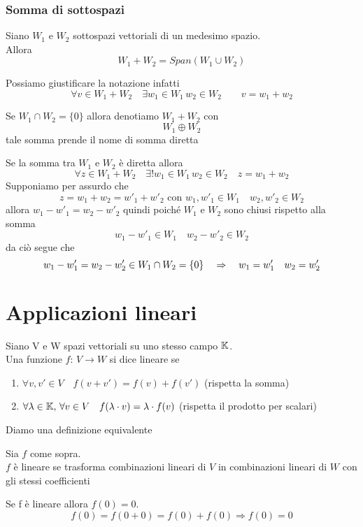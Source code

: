 \subsubsection{Somma di sottospazi}
\begin{defn}\bianco
Siano $W_1 \text{ e } W_2 $ sottospazi vettoriali di un medesimo spazio.\\
Allora 
$$ W_1+W_2 = Span (W_1 \cup W_2)$$ 
\begin{oss}
Possiamo giustificare la notazione infatti 
$$ \forall v \in W_1 + W_2 \quad \exists w_1 \in W_1 \, w_2 \in W_2 \qquad v=w_1+w_2 $$
\end{oss}
\end{defn}
\spazio 
\begin{defn}  \bianco
 Se $W_1 \cap W_2=\{0\}$ allora denotiamo 
 $ W_1+W_2$ con 
$$W_1  \oplus W_2 $$ 
tale somma prende il nome di somma diretta
\end{defn}


\begin{thm} Se la somma tra $W_1$ e $W_2$ è diretta allora $$\forall z \in W_1 +  W_2 \quad  \exists ! w_1 \in W_1 \, w_2 \in W_2 \quad z=w_1+w_2$$
\proof Supponiamo per assurdo che 
$$z=w_1+w_2=w'_1+w'_2 \text {  con }w_1, w'_1 \in W_1 \quad w_2,w'_2 \in W_2$$ allora 
$w_1-w'_1=w_2-w'_2$ quindi poiché $W_1$ e $W_2$ sono chiusi rispetto alla somma $$w_1-w'_1 \in W_1 \quad w_2-w'_2 \in W_2$$ da ciò segue che $$ w_1-w'_1=w_2-w'_2 \in W_1 \cap W_2=\{ 0 \} \quad \Rightarrow \quad w_1= w'_1\quad w_2=w'_2$$ \endproof
\end{thm}

\newpage

\section{Applicazioni lineari}
\begin{defn}\bianco
Siano V e W spazi vettoriali su uno stesso campo $\mathbb{K}$.\\
Una funzione $f:\, V \to W $ si dice lineare se 
\begin{enumerate}
\item $ \forall v,v' \in V \quad f(v+v')=f(v)+f(v')$ (rispetta la somma)
\item $\forall \lambda \in \mathbb{K} , \, \forall v \in V \quad f(\lambda \cdot v )= \lambda \cdot f(v)$ (rispetta il prodotto per scalari)
\end{enumerate}
\end{defn}
Diamo una definizione equivalente
\begin{defn}
Sia $f$ come sopra.\\
$f$  \`e lineare se trasforma combinazioni lineari di $V$ in combinazioni lineari di $W$ con gli stessi coefficienti

\end{defn}
\begin{oss} Se f è lineare allora $f(0)=0$.\\
$$f(0)=f(0+0)=f(0)+f(0) \Rightarrow f(0)=0$$
\end{oss}
\vspace{0.5 cm}

